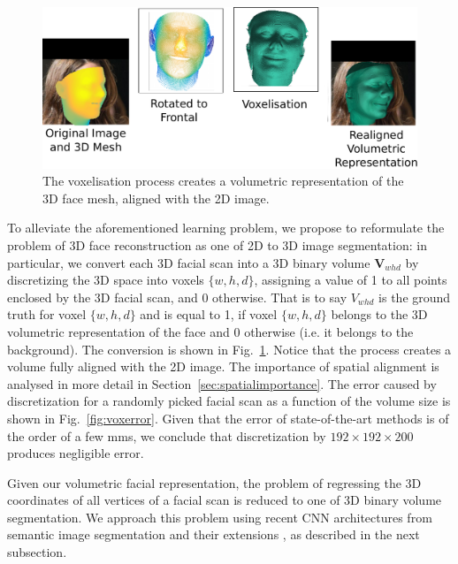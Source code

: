 \begin{figure}
  \centering
  \includegraphics[width=\linewidth]{img/discretisation.pdf}
  \caption[Dataset voxelisation procedure]{The voxelisation process
    creates a volumetric representation of the 3D face mesh, aligned
    with the 2D image.}
  \label{fig:discretisation}
\end{figure}

To alleviate the aforementioned learning problem, we propose to
reformulate the problem of 3D face reconstruction as one of 2D to 3D
image segmentation: in particular, we convert each 3D facial scan into 
a 3D binary volume $\mathbf{V}_{whd}$ by discretizing the 3D space
into voxels $\{w,h,d\}$, assigning a value of 1 to all
points enclosed by the 3D facial scan, and 0 otherwise. That is to say
$ V_{whd}$ is the ground truth for voxel $\{w,h,d\}$ and is equal to
1, if voxel $\{w,h,d\}$ belongs to the 3D volumetric representation of
the face and 0 otherwise (i.e. it belongs to the background). The
conversion is shown in Fig.~\ref{fig:discretisation}. Notice that the process creates a volume fully aligned with the 2D image. The importance of spatial alignment is analysed in more detail in Section~\ref{sec:spatialimportance}. The error caused by
discretization for a randomly picked facial scan as a function of the
volume size is shown in Fig.~\ref{fig:voxerror}. Given that the error of
state-of-the-art methods
\cite{roth2016adaptive,liu2016joint} is of the order of a few mms, we
conclude that discretization by $192\times 192\times 200$ produces negligible
error.

Given our volumetric facial representation, the problem of regressing
the 3D coordinates of all vertices of a facial scan is reduced to one
of 3D binary volume segmentation. We approach this problem using
recent CNN architectures from semantic image segmentation
\cite{long2015fully} and their extensions \cite{newell2016stacked}, as
described in the next subsection.


